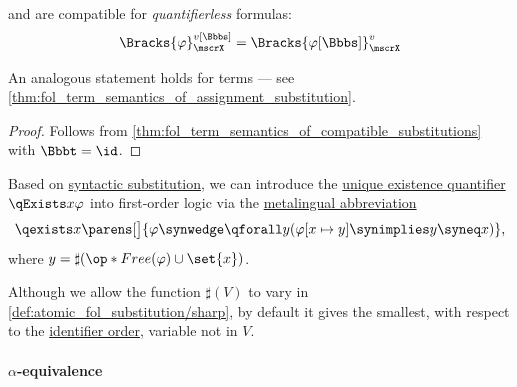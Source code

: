 \begin{corollary}\label{thm:fol_formula_semantics_of_assignment_substitution}
   and  are compatible for \emph{quantifierless} formulas:
  \begin{equation}\label{eq:thm:fol_formula_semantics_of_assignment_substitution}
    \Bracks{\varphi}_\mscrX^{v[\Bbbs]} = \Bracks{\varphi[\Bbbs]}_\mscrX^v
  \end{equation}
\end{corollary}
\begin{comments}
  \item An analogous statement holds for terms --- see \cref{thm:fol_term_semantics_of_assignment_substitution}.
\end{comments}
\begin{proof}
  Follows from \cref{thm:fol_term_semantics_of_compatible_substitutions} with \( \Bbbt = \id \).
\end{proof}

\begin{remark}\label{rem:fol_exists_unique_abbreviation}
  Based on \hyperref[def:atomic_fol_substitution]{syntactic substitution}, we can introduce the \hyperref[con:description_operator/unique_existence]{unique existence quantifier} \( \qExists x \varphi \) into first-order logic via the \hyperref[con:syntactic_abbreviation]{metalingual abbreviation}
  \begin{equation}\label{eq:rem:fol_formula_conventions/unique_existence}
    \qexists x \parens[\big]{ \varphi \synwedge \qforall y (\varphi[x \mapsto y] \synimplies y \syneq x) },
  \end{equation}
  where \( y = \sharp(\op*{Free}(\varphi) \cup \set{ x }) \).

  Although we allow the function \( \sharp(V) \) to vary in \cref{def:atomic_fol_substitution/sharp}, by default it gives the smallest, with respect to the \hyperref[def:variable_identifier]{identifier order}, variable not in \( V \).
\end{remark}

\paragraph{\( \alpha \)-equivalence}

